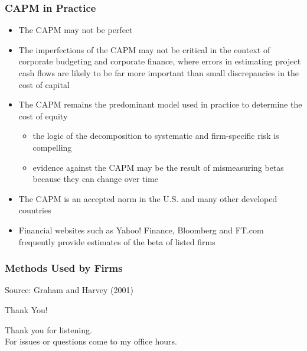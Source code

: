 \documentclass[9pt,aspectratio=169]{beamer}
\begin{document}
\begin{frame}

\frametitle{\textnormal{CAPM in Practice}}

\begin{itemize}
    \item The CAPM may not be perfect
\item The imperfections of the CAPM may not be critical in the context of corporate budgeting and corporate finance, where errors in estimating project cash flows are likely to be far more important than small discrepancies in the cost of capital
\item The CAPM remains the predominant model used in practice to determine the cost of equity
\begin{itemize}
    \item [-] the logic of the decomposition to systematic and firm-specific risk is compelling
 \item [-] evidence against the CAPM may be the result of mismeasuring betas because they can change over time
\end{itemize}
 \item The CAPM is an accepted norm in the U.S. and many other developed countries
 \item Financial websites such as Yahoo! Finance, Bloomberg and FT.com frequently provide estimates of the beta of listed firms 

\end{itemize}
\end{frame}

\begin{frame}

\frametitle{\textnormal{Methods Used by Firms}}

\begin{center}
    
    
    \tiny{Source: Graham and Harvey (2001)
}
    
\end{center}

\end{frame}

\begin{frame}{Thank You!}
\begin{center}
\vspace{1cm}

\alert{Thank you for listening.}\\
For issues or questions come to my office hours.

\vspace{1cm}
\normalsize

\end{center}
\end{frame}
\end{document}
